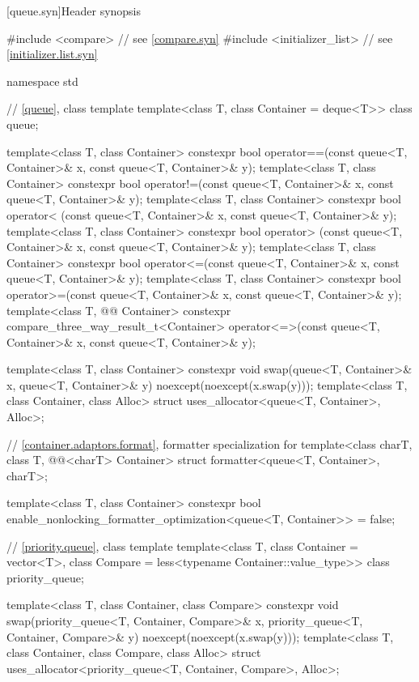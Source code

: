 [queue.syn]{Header  synopsis}

\begin{codeblock}
#include <compare>              // see \ref{compare.syn}
#include <initializer_list>     // see \ref{initializer.list.syn}

namespace std {
  // \ref{queue}, class template 
  template<class T, class Container = deque<T>> class queue;

  template<class T, class Container>
    constexpr bool operator==(const queue<T, Container>& x, const queue<T, Container>& y);
  template<class T, class Container>
    constexpr bool operator!=(const queue<T, Container>& x, const queue<T, Container>& y);
  template<class T, class Container>
    constexpr bool operator< (const queue<T, Container>& x, const queue<T, Container>& y);
  template<class T, class Container>
    constexpr bool operator> (const queue<T, Container>& x, const queue<T, Container>& y);
  template<class T, class Container>
    constexpr bool operator<=(const queue<T, Container>& x, const queue<T, Container>& y);
  template<class T, class Container>
    constexpr bool operator>=(const queue<T, Container>& x, const queue<T, Container>& y);
  template<class T, @@ Container>
    constexpr compare_three_way_result_t<Container>
      operator<=>(const queue<T, Container>& x, const queue<T, Container>& y);

  template<class T, class Container>
    constexpr void swap(queue<T, Container>& x, queue<T, Container>& y)
      noexcept(noexcept(x.swap(y)));
  template<class T, class Container, class Alloc>
    struct uses_allocator<queue<T, Container>, Alloc>;

  // \ref{container.adaptors.format}, formatter specialization for 
  template<class charT, class T, @@<charT> Container>
    struct formatter<queue<T, Container>, charT>;

  template<class T, class Container>
    constexpr bool enable_nonlocking_formatter_optimization<queue<T, Container>> = false;

  // \ref{priority.queue}, class template 
  template<class T, class Container = vector<T>,
           class Compare = less<typename Container::value_type>>
    class priority_queue;

  template<class T, class Container, class Compare>
    constexpr void swap(priority_queue<T, Container, Compare>& x,
                        priority_queue<T, Container, Compare>& y) noexcept(noexcept(x.swap(y)));
  template<class T, class Container, class Compare, class Alloc>
    struct uses_allocator<priority_queue<T, Container, Compare>, Alloc>;

}
\end{codeblock}
